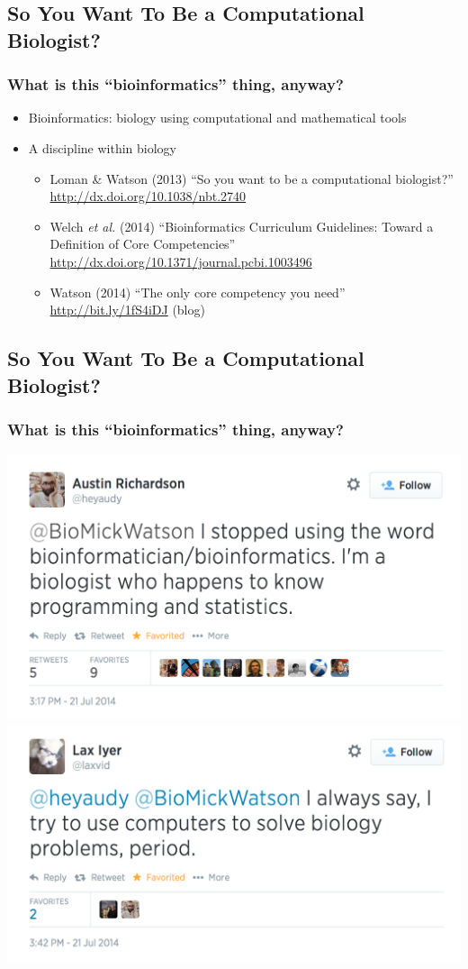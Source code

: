 %

\subsection{So You Want To Be a Computational Biologist?}
\begin{frame}
  \frametitle{What is this ``bioinformatics'' thing, anyway?}
  \begin{itemize}
    \item Bioinformatics: biology using computational and mathematical tools
    \item A discipline within biology
    \begin{itemize}
      \item Loman \& Watson (2013) ``So you want to be a computational biologist?''
        \url{http://dx.doi.org/10.1038/nbt.2740}
      \item Welch \textit{et al.} (2014) ``Bioinformatics Curriculum Guidelines: Toward a Definition of Core Competencies''
      \url{http://dx.doi.org/10.1371/journal.pcbi.1003496}
      \item Watson (2014) ``The only core competency you need'' \url{http://bit.ly/1fS4iDJ} (blog)
    \end{itemize}
  \end{itemize}
\end{frame}

\subsection{So You Want To Be a Computational Biologist?}
\begin{frame}
  \frametitle{What is this ``bioinformatics'' thing, anyway?}
  \includegraphics[width=.5\textwidth]{images/twitter_bioinformatician}
  \includegraphics[width=.5\textwidth]{images/twitter_computers_biology}  
\end{frame}

